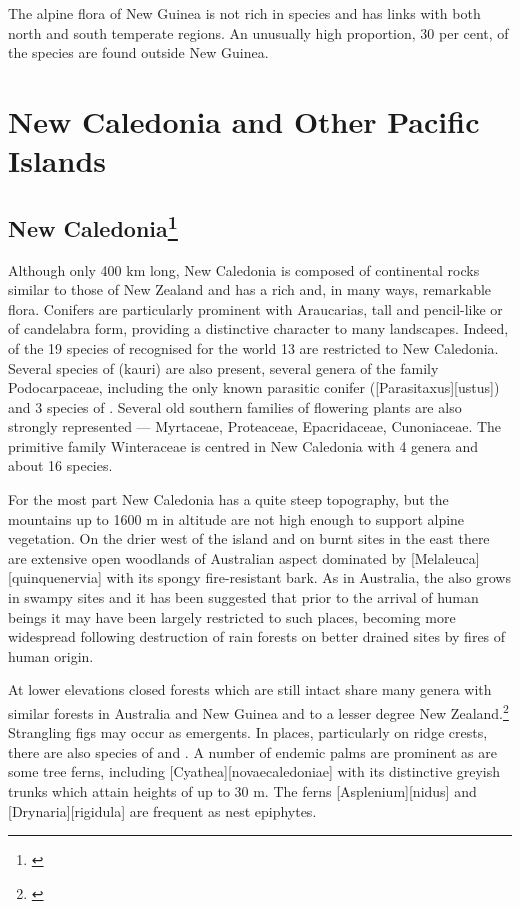 The alpine flora of New Guinea is not rich in species and has links with both north and south temperate regions.
An unusually high proportion, 30 per cent, of the species are found outside New Guinea.

\section{New Caledonia and Other Pacific Islands}

\subsection[New Caledonia]{New Caledonia\footnote{\cite{schmid1981fleurs}}}

Although only 400 km long, New Caledonia is composed of continental rocks similar to those of New Zealand and has a rich and, in many ways, remarkable flora.
Conifers are particularly prominent with Araucarias, tall and pencil-like or of candelabra form, providing a distinctive character to many landscapes.
Indeed, of the 19 species of  recognised for the world 13 are restricted to New Caledonia.
Several species of  (kauri) are also present, several genera of the family Podocarpaceae, including the only known parasitic conifer ([Parasitaxus][ustus]) and 3 species of .
Several old southern families of flowering plants are also strongly represented --- Myrtaceae, Proteaceae, Epacridaceae, Cunoniaceae.
The primitive family Winteraceae is centred in New Caledonia with 4 genera and about 16 species.

For the most part New Caledonia has a quite steep topography, but the mountains up to 1600 m in altitude are not high enough to support alpine vegetation.
On the drier west of the island and on burnt sites in the east there are extensive open woodlands of Australian aspect dominated by [Melaleuca][quinquenervia] with its spongy fire-resistant bark.
As in Australia, the  also grows in swampy sites and it has been suggested that prior to the arrival of human beings it may have been largely restricted to such places, becoming more widespread following destruction of rain forests on better drained sites by fires of human origin.

At lower elevations closed forests which are still intact share many genera with similar forests in Australia and New Guinea and to a lesser degree New Zealand.\footnote{\cite{morat1986floristic}}
Strangling figs may occur as emergents.
In places, particularly on ridge crests, there are also species of  and .
A number of endemic palms are prominent as are some tree ferns, including [Cyathea][novaecaledoniae] with its distinctive greyish trunks which attain heights of up to 30 m.
The ferns [Asplenium][nidus] and [Drynaria][rigidula] are frequent as nest epiphytes.

